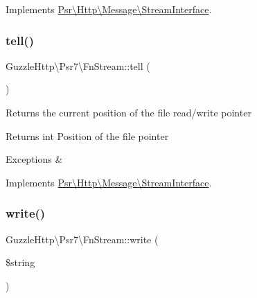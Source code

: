 Implements \hyperlink{interfacePsr_1_1Http_1_1Message_1_1StreamInterface_a96ee062dc6cf4022d655dd15eaa81208}{Psr\textbackslash{}\+Http\textbackslash{}\+Message\textbackslash{}\+Stream\+Interface}.

\mbox{\label{classGuzzleHttp_1_1Psr7_1_1FnStream_ada664b3551d9ec37a20ded966d930508}} 
\subsubsection{\texorpdfstring{tell()}{tell()}}
{\footnotesize\ttfamily Guzzle\+Http\textbackslash{}\+Psr7\textbackslash{}\+Fn\+Stream\+::tell (\begin{DoxyParamCaption}{ }\end{DoxyParamCaption})}

Returns the current position of the file read/write pointer

\begin{DoxyReturn}{Returns}
int Position of the file pointer 
\end{DoxyReturn}

\begin{DoxyExceptions}{Exceptions}
{\em } & \\
\hline
\end{DoxyExceptions}


Implements \hyperlink{interfacePsr_1_1Http_1_1Message_1_1StreamInterface_a9aa2f88a38f496d74100f42ddf0656ef}{Psr\textbackslash{}\+Http\textbackslash{}\+Message\textbackslash{}\+Stream\+Interface}.

\mbox{\label{classGuzzleHttp_1_1Psr7_1_1FnStream_ac7198f1b1058da5bde01c2f13b774c56}} 
\subsubsection{\texorpdfstring{write()}{write()}}
{\footnotesize\ttfamily Guzzle\+Http\textbackslash{}\+Psr7\textbackslash{}\+Fn\+Stream\+::write (\begin{DoxyParamCaption}\item[{}]{\$string }\end{DoxyParamCaption})}


